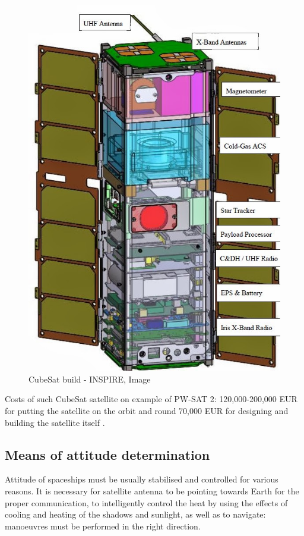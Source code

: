 \documentclass[12pt,a4paper,oneside]{article}
\begin{document}
\begin{figure}[ht]
\includegraphics[scale=0.45]{INSPIRE_JPL.jpg}
\centering
\caption{CubeSat build - INSPIRE, Image \cite{cubesat-build}}
\label{fig:cubesat-build}
\end{figure}

Costs of such CubeSat satellite on example of PW-SAT 2: 120,000-200,000 EUR for putting the satellite on the orbit and round 70,000 EUR for designing and building the satellite itself \cite{pw-pw-sat2}.


\subsection{Means of attitude determination}

Attitude of spaceships must be usually stabilised and controlled for various reasons.
It is necessary for satellite antenna to be pointing towards Earth for the proper communication, to intelligently control the heat by using the effects of cooling and heating of the shadows and sunlight, as well as to navigate: manoeuvres must be performed in the right direction.
\end{document}
